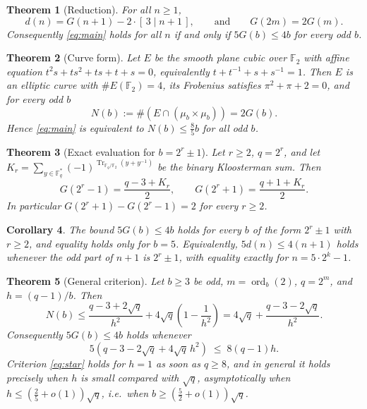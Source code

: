 \documentclass[a4paper]{article}
\newtheorem{theorem}{Theorem}[section]
\newtheorem{corollary}[theorem]{Corollary}
\theoremstyle{definition}
\newcommand{\F}{\mathbb{F}}
\newcommand{\Tr}{\operatorname{Tr}}
\begin{document}
	\begin{theorem}[Reduction]\label{thm:reduction}
		For all $n \geq 1$,
		\begin{equation*}
			d(n) = G(n+1) - 2 \cdot [\, 3 \mid n+1 \,],
			\qquad\text{and}\qquad
			G(2m) = 2 G(m).
		\end{equation*}
		Consequently \eqref{eq:main} holds for all $n$ if and only if $5 G(b) \leq 4b$ for every odd $b$.
	\end{theorem}

	\begin{theorem}[Curve form]\label{thm:curve}
		Let $E$ be the smooth plane cubic over $\F_2$ with affine equation $t^2 s + ts^2 + ts + t + s = 0$, equivalently $t + t^{-1} + s + s^{-1} = 1$.
		Then $E$ is an elliptic curve with $\#E(\F_2) = 4$, its Frobenius satisfies $\pi^2 + \pi + 2 = 0$, and for every odd $b$
		\begin{equation*}
			N(b) := \#\left(E \cap (\mu_b \times \mu_b)\right) = 2 G(b).
		\end{equation*}
		Hence \eqref{eq:main} is equivalent to $N(b) \leq \frac{8}{5} b$ for all odd $b$.
	\end{theorem}

	\begin{theorem}[Exact evaluation for $b = 2^r \pm 1$]\label{thm:kloos}
		Let $r \geq 2$, $q = 2^r$, and let $K_r = \sum_{y \in \F_q^*} (-1)^{\Tr_{\F_q/\F_2}(y + y^{-1})}$ be the binary Kloosterman sum.
		Then
		\begin{equation*}
			G(2^r - 1) = \frac{q - 3 + K_r}{2},
			\qquad
			G(2^r + 1) = \frac{q + 1 + K_r}{2}.
		\end{equation*}
		In particular $G(2^r+1) - G(2^r-1) = 2$ for every $r \geq 2$.
	\end{theorem}

	\begin{corollary}\label{cor:kloos}
		The bound $5G(b) \leq 4b$ holds for every $b$ of the form $2^r \pm 1$ with $r \geq 2$, and equality holds only for $b = 5$.
		Equivalently, $5 d(n) \leq 4(n+1)$ holds whenever the odd part of $n+1$ is $2^r \pm 1$, with equality exactly for $n = 5 \cdot 2^k - 1$.
	\end{corollary}

	\begin{theorem}[General criterion]\label{thm:weil}
		Let $b \geq 3$ be odd, $m = \operatorname{ord}_b(2)$, $q = 2^m$, and $h = (q-1)/b$.
		Then
		\begin{equation*}
			N(b) \leq \frac{q - 3 + 2\sqrt{q}}{h^2} + 4 \sqrt{q}\left(1 - \frac{1}{h^2}\right)
			= 4\sqrt q + \frac{q - 3 - 2\sqrt q}{h^2} .
		\end{equation*}
		Consequently $5 G(b) \leq 4b$ holds whenever
		\begin{equation}\label{eq:star}
			5\left(q - 3 - 2\sqrt q + 4 \sqrt q\, h^2\right) \;\leq\; 8 (q-1) h. \tag{$\star$}
		\end{equation}
		Criterion \eqref{eq:star} holds for $h = 1$ as soon as $q \geq 8$, and in general it holds precisely when $h$ is small compared with $\sqrt q$, asymptotically when $h \leq \left(\frac{2}{5} + o(1)\right)\sqrt q$, i.e.\ when $b \geq \left(\frac{5}{2}+o(1)\right)\sqrt q$.
	\end{theorem}
\end{document}
